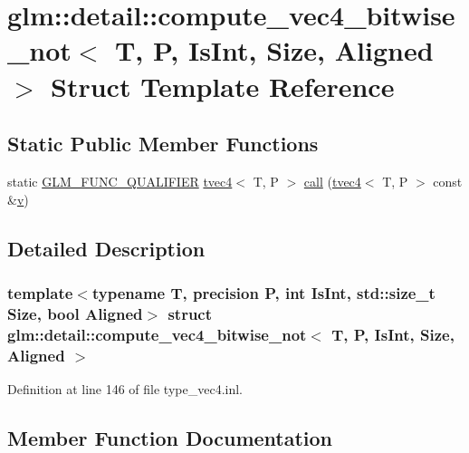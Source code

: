 \hypertarget{structglm_1_1detail_1_1compute__vec4__bitwise__not}{}\section{glm\+::detail\+::compute\+\_\+vec4\+\_\+bitwise\+\_\+not$<$ T, P, Is\+Int, Size, Aligned $>$ Struct Template Reference}
\label{structglm_1_1detail_1_1compute__vec4__bitwise__not}
\subsection*{Static Public Member Functions}
\begin{DoxyCompactItemize}
\item 
static \mbox{\hyperlink{setup_8hpp_a33fdea6f91c5f834105f7415e2a64407}{G\+L\+M\+\_\+\+F\+U\+N\+C\+\_\+\+Q\+U\+A\+L\+I\+F\+I\+ER}} \mbox{\hyperlink{structglm_1_1tvec4}{tvec4}}$<$ T, P $>$ \mbox{\hyperlink{structglm_1_1detail_1_1compute__vec4__bitwise__not_a75003ee4847f65f163002b6f4baf1b61}{call}} (\mbox{\hyperlink{structglm_1_1tvec4}{tvec4}}$<$ T, P $>$ const \&\mbox{\hyperlink{glad_8h_a14cfbe2fc2234f5504618905b69d1e06}{v}})
\end{DoxyCompactItemize}


\subsection{Detailed Description}
\subsubsection*{template$<$typename T, precision P, int Is\+Int, std\+::size\+\_\+t Size, bool Aligned$>$\newline
struct glm\+::detail\+::compute\+\_\+vec4\+\_\+bitwise\+\_\+not$<$ T, P, Is\+Int, Size, Aligned $>$}



Definition at line 146 of file type\+\_\+vec4.\+inl.



\subsection{Member Function Documentation}
\mbox{\label{structglm_1_1detail_1_1compute__vec4__bitwise__not_a75003ee4847f65f163002b6f4baf1b61}} 
